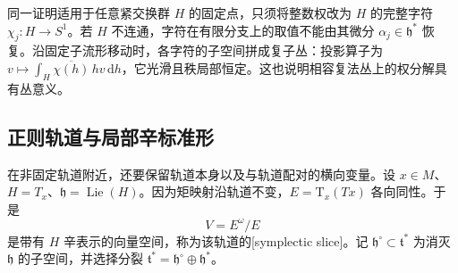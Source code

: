 同一证明适用于任意紧交换群 \(H\) 的固定点，只须将整数权改为 \(H\) 的完整字符 \(\chi_j:H\to S^1\)。若 \(H\) 不连通，字符在有限分支上的取值不能由其微分 \(\alpha_j\in\mathfrak h^*\) 恢复。沿固定子流形移动时，各字符的子空间拼成复子丛：投影算子为 \(v\mapsto\int_H\overline{\chi(h)}\,h v\,\mathrm dh\)，它光滑且秩局部恒定。这也说明相容复法丛上的权分解具有丛意义。

\subsection{正则轨道与局部辛标准形}
\label{g4:subsec:1201:02}

在非固定轨道附近，还要保留轨道本身以及与轨道配对的横向变量。设 \(x\in M\)、\(H=T_x\)、\(\mathfrak h=\operatorname{Lie}(H)\)。因为矩映射沿轨道不变，\(E=\mathrm T_x(Tx)\) 各向同性。于是
\[
	V=E^\omega/E
\]
是带有 \(H\) 辛表示的向量空间，称为该轨道的[symplectic slice]。记 \(\mathfrak h^\circ\subset\mathfrak t^*\) 为消灭 \(\mathfrak h\) 的子空间，并选择分裂 \(\mathfrak t^*=\mathfrak h^\circ\oplus\mathfrak h^*\)。

